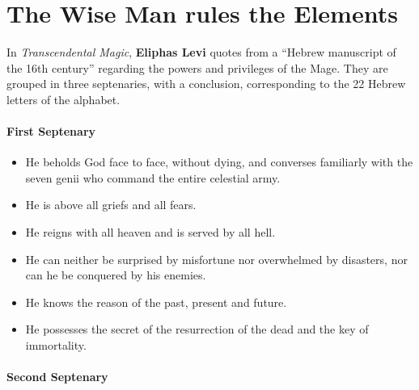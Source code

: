 \section{The Wise Man rules the Elements}

In \emph{Transcendental Magic}, \textbf{Eliphas Levi} quotes from a ``Hebrew manuscript of the 16th century'' regarding the powers and privileges of the Mage. They are grouped in three septenaries, with a conclusion, corresponding to the 22 Hebrew letters of the alphabet.

\paragraph{First Septenary}


\begin{itemize}


\item He beholds God face to face, without dying, and converses familiarly with the seven genii who command the entire celestial army.

\item He is above all griefs and all fears.

\item He reigns with all heaven and is served by all hell.

\item He can neither be surprised by misfortune nor overwhelmed by disasters, nor can he be conquered by his enemies.

\item He knows the reason of the past, present and future.

\item He possesses the secret of the resurrection of the dead and the key of immortality.
\end{itemize}


\paragraph{Second Septenary}


